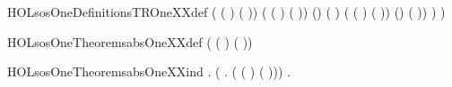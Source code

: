 \begin{SaveVerbatim}{HOLsosOneDefinitionsTROneXXdef}
              ( \HOLSymConst{=}
                 ( ) ( )) \HOLSymConst{\HOLTokenConj{}}
              ( \HOLSymConst{=}
                 ( )
                 ( )) \HOLSymConst{\HOLTokenConj{}}
              (\HOLSymConst{,}\HOLSymConst{,}) 
               ( )
                (  ( ) ( )) \HOLSymConst{\HOLTokenConj{}}
              (\HOLSymConst{,}\HOLSymConst{,})   ( )) \HOLSymConst{\HOLTokenImp{}}
               ) \HOLSymConst{\HOLTokenImp{}}
            )
\end{SaveVerbatim}
\newcommand{\HOLsosOneDefinitionsTROneXXdef}{\UseVerbatim{HOLsosOneDefinitionsTROneXXdef}}
\newcommand{\HOLsosOneDefinitions}{
\HOLDfnTag{sos1}{TR1_def}\HOLsosOneDefinitionsTROneXXdef
}
\begin{SaveVerbatim}{HOLsosOneTheoremsabsOneXXdef}
\HOLTokenTurnstile{}  (  ( ) ( )) \HOLSymConst{=} 
\end{SaveVerbatim}
\newcommand{\HOLsosOneTheoremsabsOneXXdef}{\UseVerbatim{HOLsosOneTheoremsabsOneXXdef}}
\begin{SaveVerbatim}{HOLsosOneTheoremsabsOneXXind}
\HOLTokenTurnstile{} \HOLSymConst{\HOLTokenForall{}}.
     (\HOLSymConst{\HOLTokenForall{}}  .
         (  ( ) ( ))) \HOLSymConst{\HOLTokenImp{}}
     \HOLSymConst{\HOLTokenForall{}}.  
\end{SaveVerbatim}
